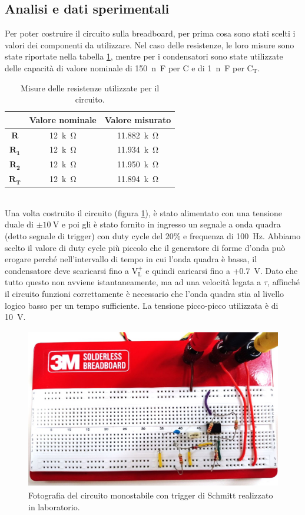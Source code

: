 \documentclass{report}
\begin{document}
\subsection{Analisi e dati sperimentali}
Per poter costruire il circuito sulla breadboard, per prima cosa sono stati scelti i valori dei componenti da utilizzare. Nel caso delle resistenze, le loro misure sono state riportate nella tabella \ref{table:mis_res1}, mentre per i condensatori sono state utilizzate delle capacità di valore nominale di \SI{150}{n\farad} per C e di \SI{1}{n\farad} per $\mathrm{C_T}$. 
\begin{table}[h!]
	\centering
	\begin{tabular}{|c|c|c|}
		\cline{2-3} 
		\multicolumn{1}{c|}{} & \textbf{Valore nominale} & \textbf{Valore misurato}\\ 
		\hline
		$\mathbf{R}$ & \SI{12}{k\ohm} & \SI{11.882}{k\ohm} \\ 
		\hline
		$\mathbf{R_1}$ & \SI{12}{k\ohm} & \SI{11.934}{k\ohm} \\ 
		\hline
		$\mathbf{R_2}$ & \SI{12}{k\ohm} & \SI{11.950}{k\ohm} \\ 
		\hline
		$\mathbf{R_T}$ & \SI{12}{k\ohm} & \SI{11.894}{k\ohm} \\ 
		\hline
	\end{tabular}
	\caption{Misure delle resistenze utilizzate per il circuito.}
	\label{table:mis_res1}
\end{table}
\\Una volta costruito il circuito (figura \ref{figura:circuito1}), è stato alimentato con una tensione duale di $\mathrm{\pm\SI{10}{\volt}}$ e poi gli è stato fornito in ingresso un segnale a onda quadra (detto segnale di trigger) con duty cycle del 20\% e frequenza di \SI{100}{\hertz}. Abbiamo scelto il valore di duty cycle più piccolo che il generatore di forme d'onda può erogare perché nell'intervallo di tempo in cui l'onda quadra è bassa, il condensatore deve scaricarsi fino a $\mathrm{V_L^+}$ e quindi caricarsi fino a +\SI{0.7}{\volt}. Dato che tutto questo non avviene istantaneamente, ma ad una velocità legata a $\tau$, affinché il circuito funzioni correttamente è necessario che l'onda quadra stia al livello logico basso per un tempo sufficiente. La tensione picco-picco utilizzata è di \SI{10}{\volt}.\\ %
\begin{figure}[h!]
	\centering
	\includegraphics[height=7cm]{immagini/circuito1}
	\caption{Fotografia del circuito monostabile con trigger di Schmitt realizzato in laboratorio.}
	\label{figura:circuito1}
\end{figure}
\end{document}
